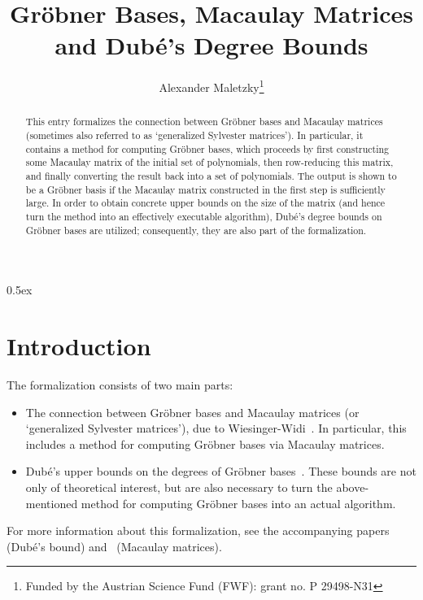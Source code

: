 \documentclass[11pt,a4paper]{article}
\begin{document}
\title{Gr\"obner Bases, Macaulay Matrices\\and Dub\'e's Degree Bounds}
\author{Alexander Maletzky\thanks{Funded by the Austrian 
Science Fund (FWF): grant no. P 29498-N31}}
\maketitle

\begin{abstract}
This entry formalizes the connection between Gr\"obner bases and Macaulay matrices (sometimes also referred to as `generalized Sylvester matrices'). In particular, it contains a method for computing Gr\"obner bases, which proceeds by first constructing some Macaulay matrix of the initial set of polynomials, then row-reducing this matrix, and finally converting the result back into a set of polynomials. The output is shown to be a Gr\"obner basis if the Macaulay matrix constructed in the first step is sufficiently large. In order to obtain concrete upper bounds on the size of the matrix (and hence turn the method into an effectively executable algorithm), Dub\'e's degree bounds on Gr\"obner bases are utilized; consequently, they are also part of the formalization.
\end{abstract}

\tableofcontents

\parindent 0pt\parskip 0.5ex

\newpage
\section{Introduction}

The formalization consists of two main parts:
\begin{itemize}
 \item The connection between Gr\"obner bases and Macaulay matrices (or `generalized Sylvester matrices'), due to Wiesinger-Widi~\cite{Wiesinger-Widi2015}. In particular, this includes a method for computing Gr\"obner bases via Macaulay matrices.
 
 \item Dub\'e's upper bounds on the degrees of Gr\"obner bases~\cite{Dube1990}. These bounds are not only of theoretical interest, but are also necessary to turn the above-mentioned method for computing Gr\"obner bases into an actual algorithm.
\end{itemize}

For more information about this formalization, see the accompanying papers~\cite{Maletzky2019} (Dub\'e's bound) and~\cite{Maletzky2019b} (Macaulay matrices).
\end{document}
